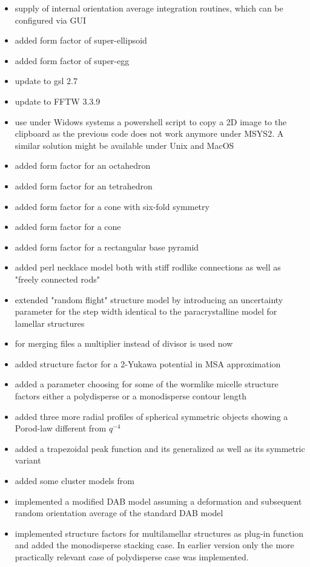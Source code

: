 \begin{description}
\begin{itemize}
    \item supply of internal orientation average integration routines, which can be configured via GUI
    \item added form factor of super-ellipsoid
    \item added form factor of super-egg
    \item update to gsl 2.7
    \item update to FFTW 3.3.9
    \item use under Widows systems a powershell script to copy a 2D image to the clipboard as the previous code does not work anymore under MSYS2. A similar solution might be available under Unix and MacOS
    \item added form factor for an octahedron
    \item added form factor for an tetrahedron
    \item added form factor for a cone with six-fold symmetry
    \item added form factor for a cone
    \item added form factor for a rectangular base pyramid
    \item added perl necklace model both with stiff rodlike connections as well as "freely connected rods"
    \item extended "random flight" structure model by introducing an uncertainty parameter for the step width identical to the paracrystalline model for lamellar structures
    \item for merging files a multiplier instead of divisor is used now
    \item added structure factor for a 2-Yukawa potential in MSA approximation
    \item added a parameter choosing for some of the wormlike micelle structure factors either a polydisperse or a monodisperse contour length
    \item added three more radial profiles of spherical symmetric objects showing a Porod-law different from $q^{-4}$
    \item added a trapezoidal peak function and its generalized as well as its symmetric variant
    \item added some cluster models from \cite{Larsen2020}
    \item implemented a modified DAB model assuming a deformation and subsequent random orientation average of the standard DAB model
    \item implemented structure factors for multilamellar structures as plug-in function and added the monodisperse stacking case. In earlier version only the more practically relevant case of polydisperse case was implemented.

\end{itemize}
\end{description}
